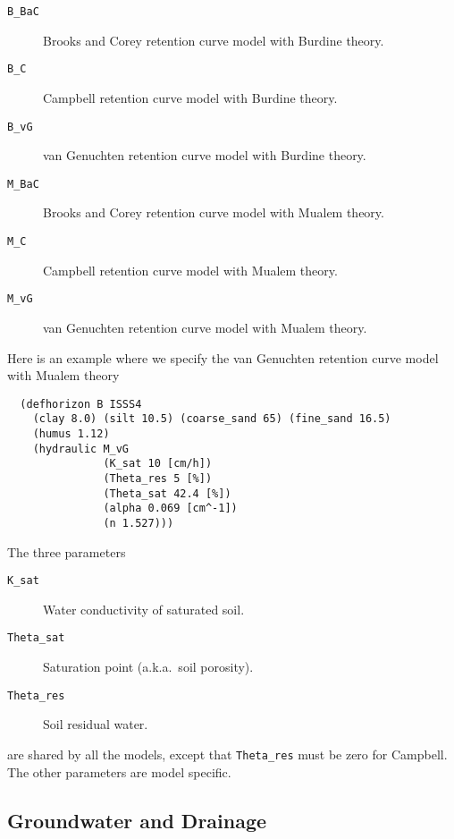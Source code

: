 \documentclass[a4paper]{article}
\begin{document}
\begin{description}
\item[\texttt{B\_BaC}] Brooks and Corey retention curve model with
  Burdine theory.
\item[\texttt{B\_C}] Campbell retention curve model with Burdine
  theory.
\item[\texttt{B\_vG}] van Genuchten retention curve model with Burdine
  theory.
\item[\texttt{M\_BaC}] Brooks and Corey retention curve model with
  Mualem theory.
\item[\texttt{M\_C}] Campbell retention curve model with Mualem
  theory.
\item[\texttt{M\_vG}] van Genuchten retention curve model with Mualem
  theory.
\end{description}

Here is an example where we specify the van Genuchten retention curve
model with Mualem theory
\begin{verbatim}
  (defhorizon B ISSS4
    (clay 8.0) (silt 10.5) (coarse_sand 65) (fine_sand 16.5)
    (humus 1.12)
    (hydraulic M_vG
               (K_sat 10 [cm/h])
               (Theta_res 5 [%])
               (Theta_sat 42.4 [%])
               (alpha 0.069 [cm^-1])
               (n 1.527)))
\end{verbatim}

The three parameters
\begin{description}
\item[\texttt{K\_sat}] Water conductivity of saturated soil.
\item[\texttt{Theta\_sat}] Saturation point (a.k.a.\ soil porosity).
\item[\texttt{Theta\_res}] Soil residual water.
\end{description}
are shared by all the models, except that \texttt{Theta\_res} must be
zero for Campbell.  The other parameters are model specific.

\subsection{Groundwater and Drainage}
\label{sec:groundwater}
\end{document}
